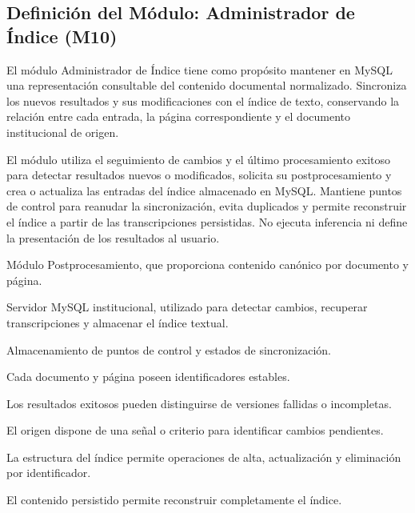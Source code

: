 \subsection{Definición del Módulo: Administrador de Índice (M10)}
\label{subsec:modulo_m10}

\begin{definicionmodulo}

\item[Propósito] El módulo Administrador de Índice tiene como propósito mantener en MySQL una representación consultable del contenido documental normalizado. Sincroniza los nuevos resultados y sus modificaciones con el índice de texto, conservando la relación entre cada entrada, la página correspondiente y el documento institucional de origen.

\item[Alcance] El módulo utiliza el seguimiento de cambios y el último procesamiento exitoso para detectar resultados nuevos o modificados, solicita su postprocesamiento y crea o actualiza las entradas del índice almacenado en MySQL. Mantiene puntos de control para reanudar la sincronización, evita duplicados y permite reconstruir el índice a partir de las transcripciones persistidas. No ejecuta inferencia ni define la presentación de los resultados al usuario.

\item[Dependencias]
\begin{elementosmodulo}
    \item Módulo Postprocesamiento, que proporciona contenido canónico por documento y página.
    \item Servidor MySQL institucional, utilizado para detectar cambios, recuperar transcripciones y almacenar el índice textual.
    \item Almacenamiento de puntos de control y estados de sincronización.
\end{elementosmodulo}

\item[Supuestos]
\begin{elementosmodulo}
    \item Cada documento y página poseen identificadores estables.
    \item Los resultados exitosos pueden distinguirse de versiones fallidas o incompletas.
    \item El origen dispone de una señal o criterio para identificar cambios pendientes.
    \item La estructura del índice permite operaciones de alta, actualización y eliminación por identificador.
    \item El contenido persistido permite reconstruir completamente el índice.
\end{elementosmodulo}


\end{definicionmodulo}
